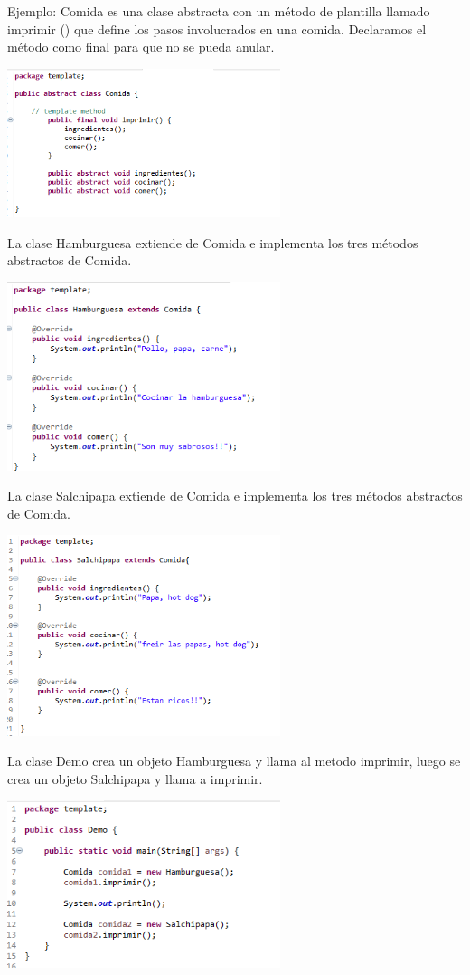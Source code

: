 \documentclass[twoside,twocolumn]{article}
\begin{document}
\smallskip
Ejemplo: Comida es una clase abstracta con un método de plantilla llamado imprimir () que define los pasos involucrados en una comida. Declaramos el método como final para que no se pueda anular. 

\includegraphics[width=8cm]{Imagenes/imagen}

La clase Hamburguesa extiende de Comida e implementa los tres métodos abstractos de Comida.

\includegraphics[width=8cm]{Imagenes/imagen2}

La clase Salchipapa extiende de Comida e implementa los tres métodos abstractos de Comida.

\includegraphics[width=8cm]{Imagenes/imagen3}

La clase Demo crea un objeto Hamburguesa y llama al metodo imprimir, luego se crea un objeto Salchipapa y llama a imprimir.

\includegraphics[width=8cm]{Imagenes/imagen4}
\end{document}

